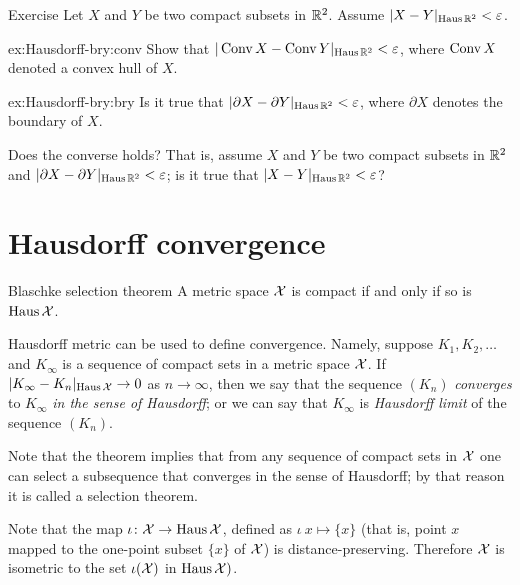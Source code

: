\begin{thm}{Exercise}\label{ex:Hausdorff-bry}
Let $X$ and $Y$ be two compact subsets in $\mathbb{R}^2$.
Assume $|X-Y|_{\operatorname{\rm Haus}\nolimits\mathbb{R}^2}<\varepsilon$.

\begin{subthm}{ex:Hausdorff-bry:conv}
Show that $|\mathop{\rm Conv}\nolimits X-\mathop{\rm Conv}\nolimits Y|_{\operatorname{\rm Haus}\nolimits\mathbb{R}^2}<\varepsilon$, where $\mathop{\rm Conv}\nolimits X$ denoted a convex hull of $X$.
\end{subthm}
\begin{subthm}{ex:Hausdorff-bry:bry}
Is it true that
$|\partial X-\partial Y|_{\operatorname{\rm Haus}\nolimits\mathbb{R}^2}<\varepsilon$,
where $\partial X$ denotes the boundary of $X$.

Does the converse holds? That is, assume $X$ and $Y$ be two compact subsets in $\mathbb{R}^2$
and $|\partial X-\partial Y|_{\operatorname{\rm Haus}\nolimits\mathbb{R}^2}<\varepsilon$; 
is it true that $|X-Y|_{\Haus\RR^2}\z<\eps$?
\end{subthm}

\end{thm}

\section{Hausdorff convergence}

\begin{thm}{Blaschke selection theorem}\label{thm:compact+Hausdorff}
A metric space $\mathcal{X}$ is compact if and only if
so is $\operatorname{\rm Haus}\nolimits\mathcal{X}$.
\end{thm}

Hausdorff metric can be used to define convergence.
Namely, suppose $K_1,K_2,\dots$ and $K_\infty$ is a sequence of compact sets in a metric space $\mathcal{X}$.
If $|K_\infty-K_n|_{\operatorname{\rm Haus}\nolimits\mathcal{X}}\to0$ as $n\to\infty$, then we say that 
the sequence $(K_n)$ {}\emph{converges} to $K_\infty$ \emph{in the sense of Hausdorff};
or we can say that $K_\infty$ is \emph{Hausdorff limit} of the sequence $(K_n)$.

Note that the theorem implies that from any sequence of compact sets in $\mathcal{X}$ one can select a subsequence that converges in the sense of Hausdorff; 
by that reason it is called a selection theorem. 

Note that the map $\iota\colon\mathcal{X}\to \operatorname{\rm Haus}\nolimits\mathcal{X}$, defined as $\iota\:x\mapsto\{x\}$
(that is, point $x$ mapped to the one-point subset $\{x\}$ of $\mathcal{X}$)
is distance-preserving.
Therefore $\mathcal{X}$ is isometric to the set $\iota(\mathcal{X})$ in $\operatorname{\rm Haus}\nolimits\mathcal{X})$.

